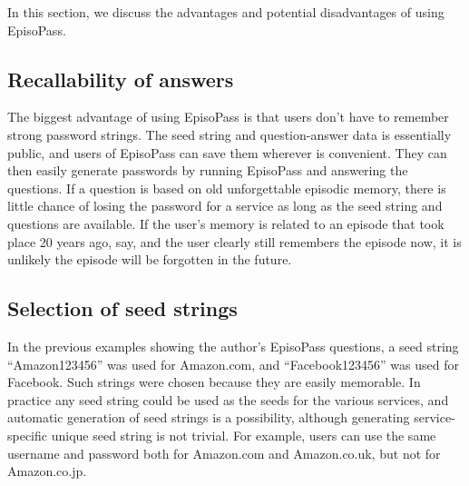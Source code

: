 \documentclass[runningheads,a4paper]{llncs}
\begin{document}
In this section, we discuss the advantages and potential disadvantages of using EpisoPass.

\subsection{Recallability of answers}



The biggest advantage of using EpisoPass is that
users don't have to remember strong password strings.
%
The seed string and question-answer data is essentially public,
and users of EpisoPass can save them wherever is convenient. They can
then easily generate passwords by running
EpisoPass and answering the questions.
If a question is based on old unforgettable episodic memory,
there is little chance of losing the password for a service
as long as the seed string and questions are available.
If the user's memory is related to an episode that took place 20 years ago, say, and the user clearly
still remembers the episode now, it is unlikely the episode will be forgotten in the future.

\subsection{Selection of seed strings}


In the previous examples showing the author's EpisoPass questions, a
seed string ``\textsf{Amazon123456}'' was used for Amazon.com, and
``\textsf{Facebook123456}'' was used for Facebook.  Such strings were
chosen because they are easily memorable.  In practice any seed string
could be used as the seeds for the various services, and automatic
generation of seed strings is a possibility, although generating
service-specific unique seed string is not trivial.  For example,
users can use the same username and password both for Amazon.com and
Amazon.co.uk, but not for Amazon.co.jp.
\end{document}
